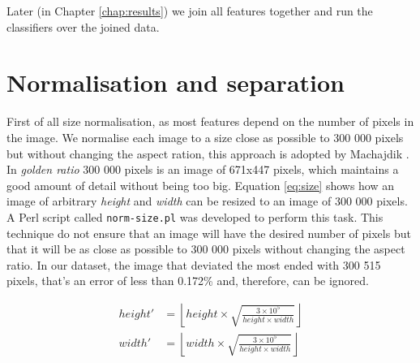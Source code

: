\documentclass[11pt,a4paper,twoside,openright]{report}
\begin{document}
Later (in Chapter \ref{chap:results}) we join all features together and run the
classifiers over the joined data.

\section{Normalisation and separation}

First of all size normalisation, as most features depend on the number of
pixels in the image.  We normalise each image to a size close as possible to
300 000 pixels but without changing the aspect ration, this approach is adopted
by Machajdik \cite{mach10clas}.  In \emph{golden ratio} 300 000 pixels is an
image of 671x447 pixels, which maintains a good amount of detail without being
too big.  Equation \ref{eq:size} shows how an image of arbitrary \emph{height}
and \emph{width} can be resized to an image of 300 000 pixels.  A Perl script
called \texttt{norm-size.pl} was developed to perform this task.  This
technique do not ensure that an image will have the desired number of pixels
but that it will be as close as possible to 300 000 pixels without changing the
aspect ratio.  In our dataset, the image that deviated the most ended with 300
515 pixels, that's an error of less than 0.172\% and, therefore, can be
ignored.

%
%

\begin{equation}
\begin{aligned}
height'  &= \left\lfloor
            height \times \sqrt{ \frac{3 \times 10^5}
                                      {height \times width} } \right\rfloor \\
width'   &= \left\lfloor
            width  \times \sqrt{ \frac{3 \times 10^5}
                                      {height \times width} } \right\rfloor \\
\label{eq:size}
\end{aligned}
\end{equation}
\end{document}
